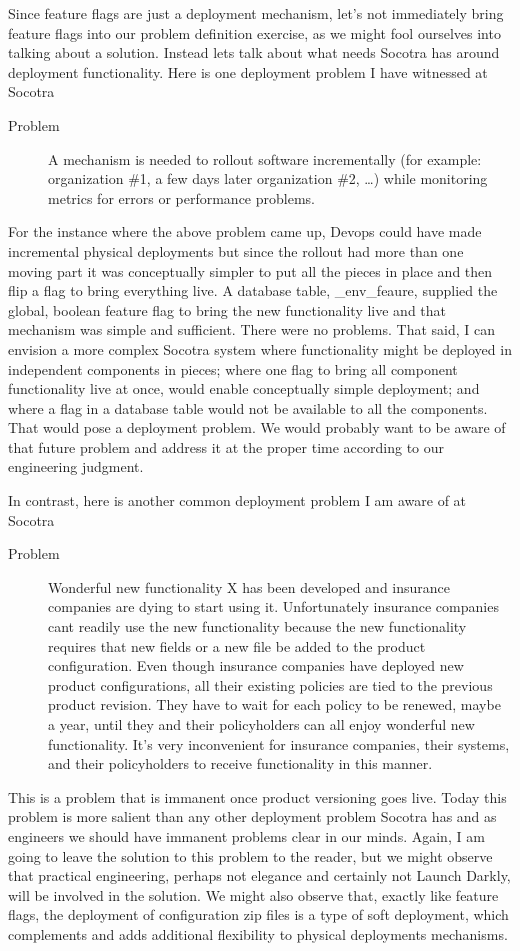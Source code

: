 Since feature flags are just a deployment mechanism, let's not immediately bring feature flags into our problem definition exercise, as we might
fool ourselves into
talking about a solution. Instead lets talk about what needs Socotra has around deployment functionality. Here is one deployment problem I
have witnessed at Socotra
\begin{description}
  \item[Problem] A mechanism is needed to rollout software incrementally (for example: organization \#1, a few days later organization \#2, \dots) while monitoring
  metrics for errors or performance problems.
\end{description}
For the instance where the above problem came up, Devops could have made incremental physical deployments but since the rollout had
more than one moving part it was conceptually simpler to put all the pieces in place and then flip a flag to bring everything live.
A database table, \_env\_feaure, supplied the global, boolean feature flag to bring the new functionality live and that mechanism was
simple and sufficient. There were no problems. That said, I can envision a more complex Socotra system where functionality might be
deployed in independent components in pieces; where one flag to bring all component functionality live at once, would enable conceptually simple deployment;
and where a flag in a database table would not be available to all the components. That would pose a deployment problem. We would probably
want to be aware of that future problem and address it at the proper time according to our engineering judgment.

In contrast, here is another common deployment problem I am aware of at Socotra
\begin{description}
  \item[Problem] Wonderful new functionality X has been developed and insurance companies are dying to start using it. Unfortunately insurance companies
  cant readily use the new functionality because the new functionality requires that new fields or a new file be added to the product configuration. Even
  though insurance companies have deployed new product configurations, all their existing policies are tied to the previous product revision. They have to wait for each
  policy to be renewed, maybe a year, until they and their policyholders can all enjoy wonderful new functionality. It's very inconvenient for insurance
  companies, their systems, and their policyholders to receive functionality in this manner.
\end{description}
This is a problem that is immanent once product versioning goes live. Today this problem  is more salient than any other deployment problem Socotra
has and as engineers we should have immanent problems clear in our minds. Again, I am going to leave the solution to this problem to the reader,
but we might observe that practical engineering, perhaps not elegance and certainly not Launch Darkly, will be involved in the solution. We might also observe
that, exactly like feature flags, the deployment of configuration zip files is a type of soft deployment, which complements and adds additional
flexibility to physical deployments mechanisms.

